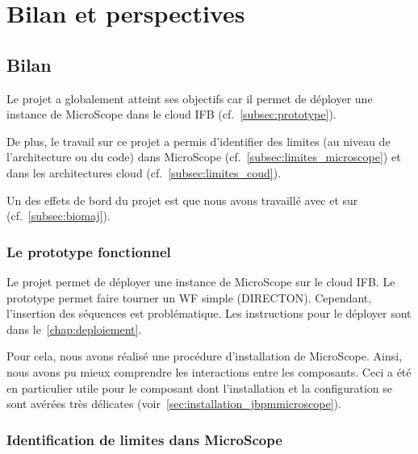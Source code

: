 \chapter{Bilan et perspectives}

\section{Bilan}

Le projet a globalement atteint ses objectifs car il permet de déployer une instance de MicroScope dans le cloud IFB (cf.~\autoref{subsec:prototype}).

De plus, le travail sur ce projet a permis d'identifier des limites (au niveau de l'architecture ou du code) dans MicroScope (cf.~\autoref{subsec:limites_microscope})
et dans les architectures cloud (cf.~\autoref{subsec:limites_coud}).

Un des effets de bord du projet est que nous avons travaillé avec et sur  (cf.~\autoref{subsec:biomaj}).

\subsection{Le prototype fonctionnel} \label{subsec:prototype}

Le projet permet de déployer une instance de MicroScope
sur le cloud IFB.
Le prototype permet faire tourner un WF simple (DIRECTON).
Cependant, l'insertion des séquences est problématique.
Les instructions pour le déployer sont dans le~\autoref{chap:deploiement}.

Pour cela, nous avons réalisé une procédure d'installation de MicroScope.
Ainsi, nous avons pu mieux comprendre les interactions entre les composants.
Ceci a été en particulier utile pour le composant  dont l'installation et la configuration
se sont avérées très délicates (voir~\autoref{sec:installation_jbpmmicroscope}).

\subsection{Identification de limites dans MicroScope} \label{subsec:limites_microscope}


